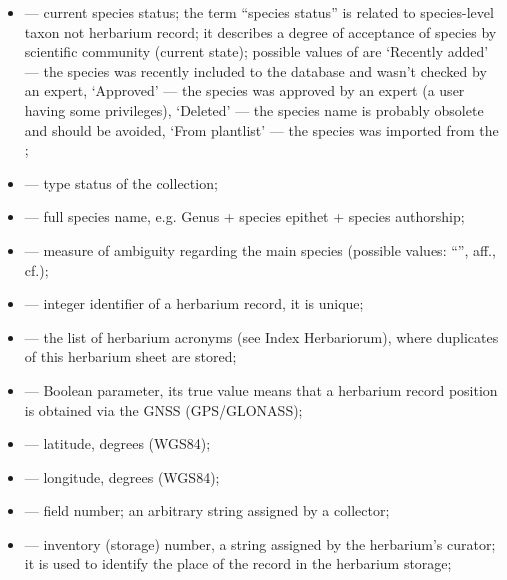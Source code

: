\documentclass[letterpaper,10pt,english]{sphinxmanual}
\begin{document}
\begin{itemize}
\item {} 
 — current species status;
the term “species status” is related to species-level taxon not
herbarium record; it describes a degree of acceptance of
species by scientific community (current state);
possible values of  are ‘Recently added’ —
the species was recently included to the database and wasn’t
checked by an expert, ‘Approved’ — the species was approved by
an expert (a user having some privileges),
‘Deleted’ — the species name is probably obsolete and should be avoided,
‘From plantlist’ — the species was imported from the ;

\item {} 
 — type status of the collection;

\item {} 
 — full species name, e.g. Genus + species epithet + species authorship;

\item {} 
 — measure of ambiguity regarding the main species (possible values: “”, aff., cf.);

\item {} 
 — integer identifier of a herbarium record, it is unique;

\item {} 
 — the list of herbarium acronyms (see Index Herbariorum), where duplicates of this herbarium sheet are stored;

\item {} 
 — Boolean parameter, its true value means that a herbarium record
position is obtained via the GNSS (GPS/GLONASS);

\item {} 
 —  latitude, degrees (WGS84);

\item {} 
 — longitude, degrees (WGS84);

\item {} 
 — field number; an arbitrary string assigned by a collector;

\item {} 
 — inventory (storage) number, a string assigned by the herbarium’s curator;
it is used to identify the place of the record in the herbarium storage;


\end{itemize}
\end{document}
